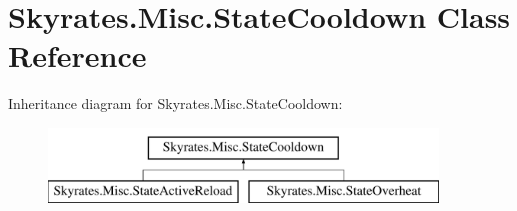 \hypertarget{class_skyrates_1_1_misc_1_1_state_cooldown}{\section{Skyrates.\-Misc.\-State\-Cooldown Class Reference}
\label{class_skyrates_1_1_misc_1_1_state_cooldown}
}
Inheritance diagram for Skyrates.\-Misc.\-State\-Cooldown\-:\begin{figure}[H]
\begin{center}
\leavevmode
\includegraphics[height=2.000000cm]{class_skyrates_1_1_misc_1_1_state_cooldown}
\end{center}
\end{figure}
